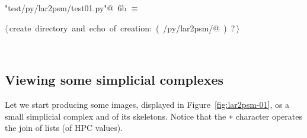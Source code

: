 \documentclass[11pt,oneside]{article}	%
\begin{document}
\begin{flushleft} \small
\begin{minipage}{\linewidth} \label{scrap18}
\protect{}\verb@"test/py/lar2psm/test01.py"@\nobreak\ {\footnotesize 6b }$\equiv$
\vspace{-1ex}
\begin{list}{}{} \item
\mbox{}\verb@@\hbox{$\langle\,$create directory and echo of creation:\nobreak\ ({\footnotesize {}\label{scrap19}
 }\mbox{}\verb@test/py/lar2psm/@ ) {\footnotesize ?}$\,\rangle$}\verb@@\\
\mbox{}\verb@@{\NWsep}
\end{list}
\vspace{-2ex}
\end{minipage}\\[4ex]
\end{flushleft}


\subsection{Viewing some simplicial complexes}
Let we start producing some images, displayed in Figure~\ref{fig:lar2psm-01}, os a small simplicial complex and of its skeletons. Notice that the \texttt{+} character operates the join of lists (of HPC values).
\end{document}
